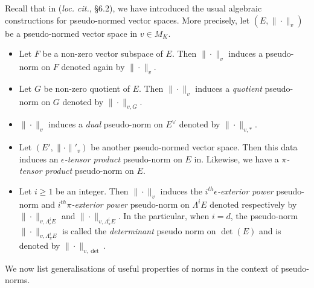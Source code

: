 \documentclass [11pt,reqno]{amsart}
\newcommand{\1}{\mathmybb{1}}
\begin{document}
Recall that in (\emph{loc. cit.}, \S 6.2), we have introduced the usual algebraic constructions for pseudo-normed vector spaces. More precisely, let $(E,\|\cdot\|_{v})$ be a pseudo-normed vector space in $v\in M_{K}$. 
\begin{itemize}
	\item[(1)] Let $F$ be a non-zero vector subspace of $E$. Then $\|\cdot\|_{v}$ induces a pseudo-norm on $F$ denoted again by $\|\cdot\|_{v}$.
	\item[(2)] Let $G$ be non-zero quotient of $E$. Then $\|\cdot\|_{v}$ induces a \emph{quotient} pseudo-norm on $G$ denoted by $\|\cdot\|_{v,G}$.
	\item[(3)] $\|\cdot\|_{v}$ induces a \emph{dual} pseudo-norm on $E^{\vee}$ denoted by $\|\cdot\|_{v,\ast}$.
	\item[(4)] Let $(E',\|\cdot\|'_{v})$ be another pseudo-normed vector space. Then this data induces an $\epsilon$\emph{-tensor product} pseudo-norm on $E$ in. Likewise, we have a $\pi$\emph{-tensor product} pseudo-norm on $E$.
	\item[(5)] Let $i\geq 1$ be an integer. Then $\|\cdot\|_{v}$ induces the $i^{th}\epsilon$\emph{-exterior power} pseudo-norm and $i^{th}\pi$\emph{-exterior power} pseudo-norm on $\Lambda^{i}E$ denoted respectively by $\|\cdot\|_{v,\Lambda_{\epsilon}^{i}E}$ and $\|\cdot\|_{v,\Lambda_{\pi}^{i}E}$. In the particular, when $i=d$, the pseudo-norm $\|\cdot\|_{v,\Lambda_{\pi}^{i}E}$ is called the \emph{determinant} pseudo norm on $\det(E)$ and is denoted by $\|\cdot\|_{v,\det}$.
\end{itemize}

We now list generalisations of useful properties of norms in the context of pseudo-norms. 
\end{document}
